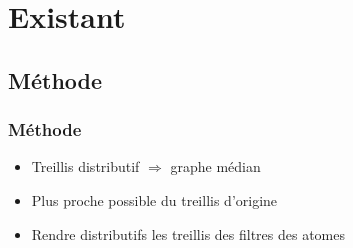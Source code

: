 \documentclass{beamer}
\begin{document}
\section{Existant}

\subsection{Méthode}

\begin{frame}
	\frametitle{Méthode}
	\begin{itemize}
		\item Treillis distributif $\Rightarrow$ graphe médian
		\item Plus proche possible du treillis d'origine
	\end{itemize}
	\begin{itemize}
		\item Rendre distributifs les treillis des filtres des atomes
	\end{itemize}
\end{frame}
\end{document}
